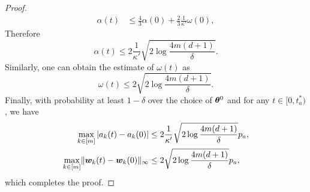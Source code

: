 \documentclass{article}
\begin{document}
\begin{proof}
\begin{align*}
        \alpha(t) & \leq\frac{4}{3}\alpha(0)+\frac{2}{3}\frac{1}{\kappa'}\omega(0),
    \end{align*}
    Therefore
    \begin{equation*}
        \alpha(t)\leq 2\frac{1}{\kappa'}\sqrt{2\log\frac{4m(d+1)}{\delta}}.
    \end{equation*}
    Similarly, one can obtain the estimate of $\omega(t)$ as
    \begin{equation*}
        \omega(t)\leq 2\sqrt{2\log\frac{4m(d+1)}{\delta}}.
    \end{equation*}
    Finally, with probability at least $1-\delta$ over the choice of $\bm{\theta}^0$ and for any $t\in[0, t^*_a)$, we have
    \begin{equation*}
        \begin{aligned}
            \max\limits_{k\in[m]}|a_k(t) - a_k(0)|
             & \leq 2\frac{1}{\kappa'}\sqrt{2\log\frac{4m(d+1)}{\delta}}p_a, \\
            \max\limits_{k\in[m]}\lVert\bm{w}_k(t) - \bm{w}_k(0)\rVert_{\infty}
             & \leq 2\sqrt{2\log\frac{4m(d+1)}{\delta}}p_a,
        \end{aligned}
    \end{equation*}
    which completes the proof.
\end{proof}
\end{document}
